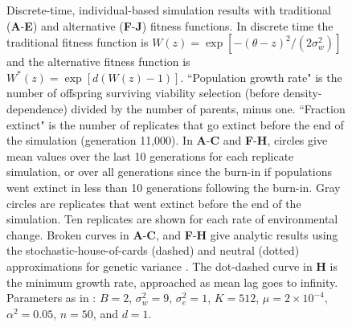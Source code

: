 \documentclass[12pt,letterpaper]{article} %
\begin{document}
\begin{figure}[!ht]
\centering
\caption{
Discrete-time, individual-based simulation results with traditional (\textbf{A}-\textbf{E}) and alternative (\textbf{F}-\textbf{J}) fitness functions.
In discrete time the traditional fitness function is $W(z) = \exp\left[ -(\theta - z)^2 / (2\sigma_w^2) \right]$ \citep[][equation 1]{Burger1995} and the alternative fitness function is $W^*(z) = \exp\left[ d(W(z) - 1)\right]$.
``Population growth rate" is the number of offspring surviving viability selection (before density-dependence) divided by the number of parents, minus one. 
``Fraction extinct" is the number of replicates that go extinct before the end of the simulation (generation 11,000).
In \textbf{A}-\textbf{C} and \textbf{F}-\textbf{H}, circles give mean values over the last 10 generations for each replicate simulation, or over all generations since the burn-in if populations went extinct in less than 10 generations following the burn-in.
Gray circles are replicates that went extinct before the end of the simulation.  
Ten replicates are shown for each rate of environmental change.
Broken curves in \textbf{A}-\textbf{C}, and \textbf{F}-\textbf{H} give analytic results using the stochastic-house-of-cards (dashed) and neutral (dotted) approximations for genetic variance \citep[equations 14 and 15 in][]{Burger1995}.
The dot-dashed curve in \textbf{H} is the minimum growth rate, approached as mean lag goes to infinity.
Parameters as in \cite{Burger1995}: $B = 2$, $\sigma_w^2 = 9$, $\sigma_e^2 = 1$, $K=512$, $\mu = 2\times10^{-4}$, $\alpha^2 = 0.05$, $n=50$, and $d=1$.
}
\label{ModerateSummaryLast}
\end{figure}
\end{document}

